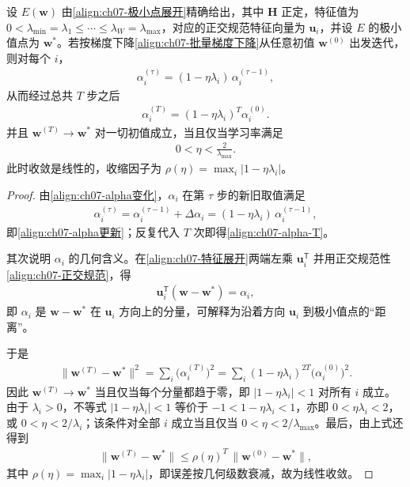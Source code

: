 \documentclass[../../main.tex]{subfiles}
\begin{document}
\begin{theorem}[二次近似下的线性收敛]\label{theorem:ch07-线性收敛}
设 $E(\mathbf{w})$ 由\eqref{align:ch07-极小点展开}精确给出，其中 $\mathbf{H}$ 正定，特征值为 $0<\lambda_{\min}=\lambda_1\leqslant\cdots\leqslant\lambda_W=\lambda_{\max}$，对应的正交规范特征向量为 $\mathbf{u}_i$，并设 $E$ 的极小值点为 $\mathbf{w}^{\ast}$。若按梯度下降\eqref{align:ch07-批量梯度下降}从任意初值 $\mathbf{w}^{(0)}$ 出发迭代，则对每个 $i$，
\begin{align}
\alpha_i^{(\tau)} = (1-\eta\lambda_i)\,\alpha_i^{(\tau-1)},
\label{align:ch07-alpha更新}
\end{align}
从而经过总共 $T$ 步之后
\begin{align}
\alpha_i^{(T)} = (1-\eta\lambda_i)^{T}\alpha_i^{(0)}.
\label{align:ch07-alpha-T}
\end{align}
并且 $\mathbf{w}^{(T)}\to\mathbf{w}^{\ast}$ 对一切初值成立，当且仅当学习率满足
\begin{align}
0<\eta<\frac{2}{\lambda_{\max}}.
\label{align:ch07-学习率上界}
\end{align}
此时收敛是线性的，收缩因子为 $\rho(\eta)=\max_i|1-\eta\lambda_i|$。
\end{theorem}
\begin{proof}
由\eqref{align:ch07-alpha变化}，$\alpha_i$ 在第 $\tau$ 步的新旧取值满足
\begin{align*}
\alpha_i^{(\tau)} = \alpha_i^{(\tau-1)}+\Delta\alpha_i = (1-\eta\lambda_i)\,\alpha_i^{(\tau-1)},
\end{align*}
即\eqref{align:ch07-alpha更新}；反复代入 $T$ 次即得\eqref{align:ch07-alpha-T}。

其次说明 $\alpha_i$ 的几何含义。在\eqref{align:ch07-特征展开}两端左乘 $\mathbf{u}_i^{\mathsf T}$ 并用正交规范性\eqref{align:ch07-正交规范}，得
\begin{align*}
\mathbf{u}_i^{\mathsf T}(\mathbf{w}-\mathbf{w}^{\ast}) = \alpha_i,
\end{align*}
即 $\alpha_i$ 是 $\mathbf{w}-\mathbf{w}^{\ast}$ 在 $\mathbf{u}_i$ 方向上的分量，可解释为沿着方向 $\mathbf{u}_i$ 到极小值点的“距离”。

于是
\begin{align*}
\|\mathbf{w}^{(T)}-\mathbf{w}^{\ast}\|^{2} = \sum_i\bigl(\alpha_i^{(T)}\bigr)^{2} = \sum_i(1-\eta\lambda_i)^{2T}\bigl(\alpha_i^{(0)}\bigr)^{2}.
\end{align*}
因此 $\mathbf{w}^{(T)}\to\mathbf{w}^{\ast}$ 当且仅当每个分量都趋于零，即 $|1-\eta\lambda_i|<1$ 对所有 $i$ 成立。由于 $\lambda_i>0$，不等式 $|1-\eta\lambda_i|<1$ 等价于 $-1<1-\eta\lambda_i<1$，亦即 $0<\eta\lambda_i<2$，或 $0<\eta<2/\lambda_i$；该条件对全部 $i$ 成立当且仅当 $0<\eta<2/\lambda_{\max}$。最后，由上式还得到
\begin{align*}
\|\mathbf{w}^{(T)}-\mathbf{w}^{\ast}\| \leqslant \rho(\eta)^{T}\,\|\mathbf{w}^{(0)}-\mathbf{w}^{\ast}\|,
\end{align*}
其中 $\rho(\eta)=\max_i|1-\eta\lambda_i|$，即误差按几何级数衰减，故为线性收敛。
\end{proof}
\end{document}

